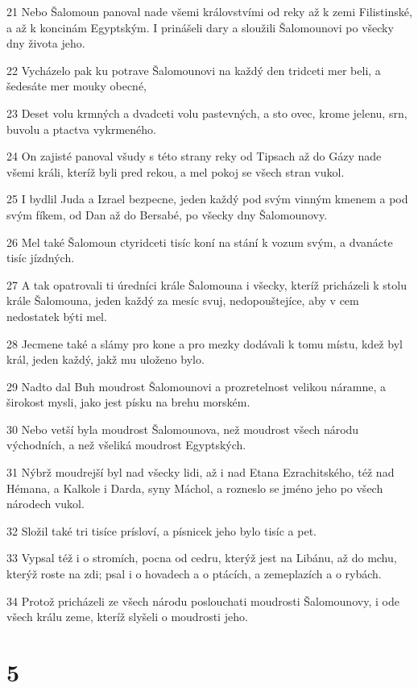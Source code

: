 \par 21 Nebo Šalomoun panoval nade všemi královstvími od reky až k zemi Filistinské, a až k koncinám Egyptským. I prinášeli dary a sloužili Šalomounovi po všecky dny života jeho.
\par 22 Vycházelo pak ku potrave Šalomounovi na každý den tridceti mer beli, a šedesáte mer mouky obecné,
\par 23 Deset volu krmných a dvadceti volu pastevných, a sto ovec, krome jelenu, srn, buvolu a ptactva vykrmeného.
\par 24 On zajisté panoval všudy s této strany reky od Tipsach až do Gázy nade všemi králi, kteríž byli pred rekou, a mel pokoj se všech stran vukol.
\par 25 I bydlil Juda a Izrael bezpecne, jeden každý pod svým vinným kmenem a pod svým fíkem, od Dan až do Bersabé, po všecky dny Šalomounovy.
\par 26 Mel také Šalomoun ctyridceti tisíc koní na stání k vozum svým, a dvanácte tisíc jízdných.
\par 27 A tak opatrovali ti úredníci krále Šalomouna i všecky, kteríž pricházeli k stolu krále Šalomouna, jeden každý za mesíc svuj, nedopouštejíce, aby v cem nedostatek býti mel.
\par 28 Jecmene také a slámy pro kone a pro mezky dodávali k tomu místu, kdež byl král, jeden každý, jakž mu uloženo bylo.
\par 29 Nadto dal Buh moudrost Šalomounovi a prozretelnost velikou náramne, a širokost mysli, jako jest písku na brehu morském.
\par 30 Nebo vetší byla moudrost Šalomounova, než moudrost všech národu východních, a než všeliká moudrost Egyptských.
\par 31 Nýbrž moudrejší byl nad všecky lidi, až i nad Etana Ezrachitského, též nad Hémana, a Kalkole i Darda, syny Máchol, a rozneslo se jméno jeho po všech národech vukol.
\par 32 Složil také tri tisíce prísloví, a písnicek jeho bylo tisíc a pet.
\par 33 Vypsal též i o stromích, pocna od cedru, kterýž jest na Libánu, až do mchu, kterýž roste na zdi; psal i o hovadech a o ptácích, a zemeplazích a o rybách.
\par 34 Protož pricházeli ze všech národu poslouchati moudrosti Šalomounovy, i ode všech králu zeme, kteríž slyšeli o moudrosti jeho.

\chapter{5}

